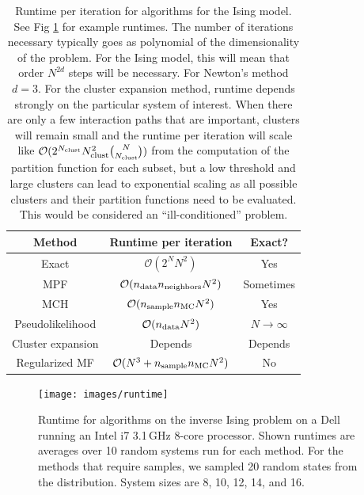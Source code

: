 \documentclass[aps,prl,twocolumn]{revtex4-1}
\begin{document}
%

\begin{table}[bt]
\begin{center}
\begin{tabular}{|c|c|c|}
\hline
	Method 	& Runtime per iteration & Exact? \\
\hline
	Exact 	& $\mathcal{O}(2^N N^2)$ & Yes\\
	MPF		& $\mathcal{O}(n_{\rm data}n_{\rm neighbors}N^2)$ & Sometimes\\
	MCH 	& $\mathcal{O}(n_{\rm sample}n_{\rm MC}N^2)$ & Yes\\
	Pseudolikelihood & $\mathcal{O}(n_{\rm data}N^2)$ & $N\rightarrow\infty$\\
	Cluster expansion & Depends & Depends\\
	Regularized MF & $\mathcal{O}(N^3 + n_{\rm sample}n_{\rm MC}N^2)$ & No\\
\hline
\end{tabular}
\caption{Runtime per iteration for algorithms for the Ising model. See Fig \ref{gr:runtime} for example runtimes. 
The number of iterations necessary typically goes as polynomial of the dimensionality of the problem. For the Ising model, this will mean that order $N^{2d}$ steps will be necessary. For Newton's method $d=3$.
For the cluster expansion method, runtime depends strongly on the particular system of interest. When there are only a few interaction paths that are important, clusters will remain small and the runtime per iteration will scale like $\mathcal{O}(2^{N_{\rm clust}}N_{\rm clust}^2\binom{N}{N_{\rm clust}})$ from the computation of the partition function for each subset, but a low threshold and large clusters can lead to exponential scaling as all possible clusters and their partition functions need to be evaluated. This would be considered an ``ill-conditioned'' problem.}
\end{center}
\label{tb:runtime}
\end{table}%

\begin{figure}[tb]\centering
	\texttt{[image: images/runtime]}
\caption{Runtime for algorithms on the inverse Ising problem on a Dell running an Intel i7 3.1\,GHz 8-core processor. Shown runtimes are averages over 10 random systems run for each method. For the methods that require samples, we sampled 20 random states from the distribution. System sizes are 8, 10, 12, 14, and 16.}
\label{gr:runtime}
\end{figure}
\end{document}
